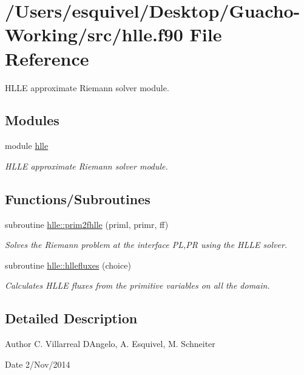 \hypertarget{hlle_8f90}{}\section{/\+Users/esquivel/\+Desktop/\+Guacho-\/\+Working/src/hlle.f90 File Reference}
\label{hlle_8f90}


H\+L\+L\+E approximate Riemann solver module.  


\subsection*{Modules}
\begin{DoxyCompactItemize}
\item 
module \hyperlink{namespacehlle}{hlle}
\begin{DoxyCompactList}\small\item\em H\+L\+L\+E approximate Riemann solver module. \end{DoxyCompactList}\end{DoxyCompactItemize}
\subsection*{Functions/\+Subroutines}
\begin{DoxyCompactItemize}
\item 
subroutine \hyperlink{namespacehlle_a5646b0259c574b5e8dd3754a493d358d}{hlle\+::prim2fhlle} (priml, primr, ff)
\begin{DoxyCompactList}\small\item\em Solves the Riemann problem at the interface P\+L,P\+R using the H\+L\+L\+E solver. \end{DoxyCompactList}\item 
subroutine \hyperlink{namespacehlle_a03540214994c25ce07877114dd37b641}{hlle\+::hllefluxes} (choice)
\begin{DoxyCompactList}\small\item\em Calculates H\+L\+L\+E fluxes from the primitive variables on all the domain. \end{DoxyCompactList}\end{DoxyCompactItemize}


\subsection{Detailed Description}
\begin{DoxyAuthor}{Author}
C. Villarreal D\textquotesingle{}Angelo, A. Esquivel, M. Schneiter 
\end{DoxyAuthor}
\begin{DoxyDate}{Date}
2/\+Nov/2014 
\end{DoxyDate}
